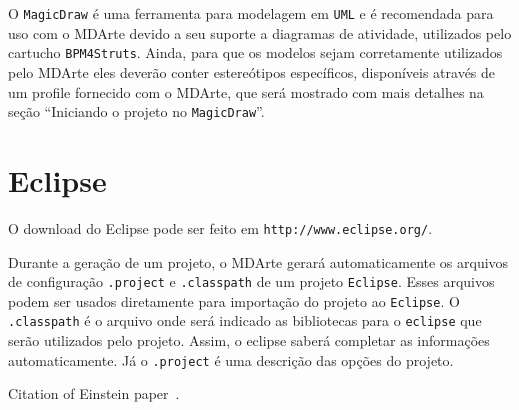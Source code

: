 O \texttt{MagicDraw} é uma ferramenta para modelagem em \texttt{UML} e é
recomendada para uso com o MDArte devido a seu suporte a diagramas de atividade,
utilizados pelo cartucho \texttt{BPM4Struts}. Ainda, para que os modelos sejam
corretamente utilizados pelo MDArte eles deverão conter estereótipos
específicos, disponíveis através de um profile fornecido com o MDArte, que será
mostrado com mais detalhes na seção “Iniciando o projeto no \texttt{MagicDraw}”.

\section{Eclipse}

O download do Eclipse pode ser feito em \texttt{http://www.eclipse.org/}. 

Durante a geração de um projeto, o MDArte gerará automaticamente os arquivos de
configuração \texttt{.project} e \texttt{.classpath} de um projeto
\texttt{Eclipse}. Esses arquivos podem ser usados diretamente para importação do
projeto ao \texttt{Eclipse}. O \texttt{.classpath} é o arquivo onde será
indicado as bibliotecas para o \texttt{eclipse} que serão utilizados pelo
projeto. Assim, o eclipse saberá completar as informações automaticamente. Já o
\texttt{.project} é uma descrição das opções do projeto.

Citation of Einstein paper~\cite{Einstein}.